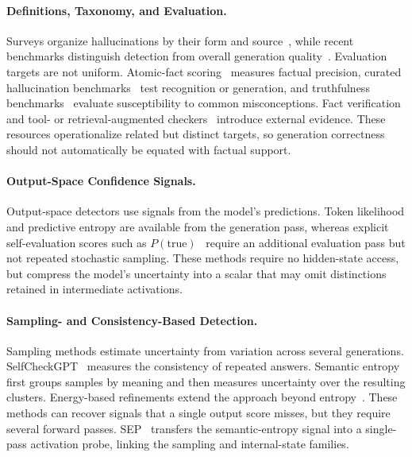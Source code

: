 \paragraph{Definitions, Taxonomy, and Evaluation.}
Surveys organize hallucinations by their form and source~\citep{ji2022survey}, while
recent benchmarks distinguish detection from overall generation
quality~\citep{bang2025hallulens}. Evaluation targets are not uniform. Atomic-fact
scoring~\citep{min2023factscore} measures factual precision, curated hallucination
benchmarks~\citep{li2023halueval} test recognition or generation, and truthfulness
benchmarks~\citep{lin2021truthfulqa,lin2022truthfulqa} evaluate susceptibility to
common misconceptions. Fact verification~\citep{thorne2018fever} and tool- or
retrieval-augmented checkers~\citep{peng2023check,chern2023factool} introduce
external evidence. These resources operationalize related but distinct targets, so
generation correctness should not automatically be equated with factual support.

\paragraph{Output-Space Confidence Signals.}
Output-space detectors use signals from the model's predictions. Token likelihood
and predictive entropy are available from the generation pass, whereas explicit
self-evaluation scores such as $P(\mathrm{true})$~\citep{kadavath2022language}
require an additional evaluation pass but not repeated stochastic sampling. These
methods require no hidden-state access, but compress the model's uncertainty into a
scalar that may omit distinctions retained in intermediate activations.

\paragraph{Sampling- and Consistency-Based Detection.}
Sampling methods estimate uncertainty from variation across several generations.
SelfCheckGPT~\citep{manakul2023selfcheckgpt} measures the consistency of repeated
answers. Semantic entropy~\citep{farquhar2024detecting} first groups samples by
meaning and then measures uncertainty over the resulting clusters. Energy-based
refinements extend the approach beyond entropy~\citep{ma2025semantic}. These methods
can recover signals that a single output score misses, but they require several
forward passes. SEP~\citep{kossen2024semantic} transfers the semantic-entropy signal
into a single-pass activation probe, linking the sampling and internal-state
families.

